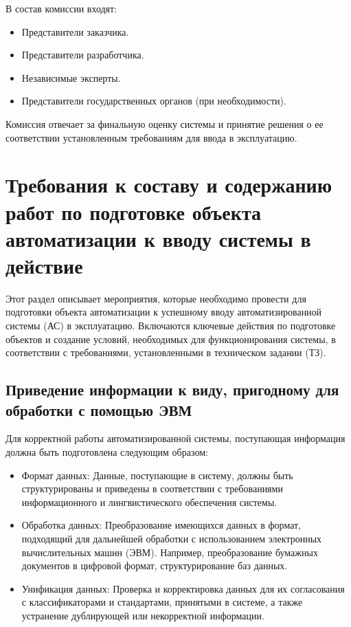 \noindent В состав комиссии входят:
\begin{itemize}
    \item Представители заказчика.
    \item Представители разработчика.
    \item Независимые эксперты.
    \item Представители государственных органов (при необходимости).
\end{itemize}

Комиссия отвечает за финальную оценку системы и принятие решения о ее соответствии установленным требованиям для ввода в эксплуатацию.

\section{Требования к составу и содержанию работ по подготовке объекта
автоматизации к вводу системы в действие}

Этот раздел описывает мероприятия, которые необходимо провести для подготовки объекта автоматизации к успешному вводу автоматизированной системы (АС) в эксплуатацию. Включаются ключевые действия по подготовке объектов и создание условий, необходимых для функционирования системы, в соответствии с требованиями, установленными в техническом задании (ТЗ).

\subsection{Приведение информации к виду, пригодному для обработки с помощью ЭВМ}
Для корректной работы автоматизированной системы, поступающая информация должна быть подготовлена следующим образом:
\begin{itemize}
    \item Формат данных: Данные, поступающие в систему, должны быть структурированы и приведены в соответствии с требованиями информационного и лингвистического обеспечения системы.
    \item Обработка данных: Преобразование имеющихся данных в формат, подходящий для дальнейшей обработки с использованием электронных вычислительных машин (ЭВМ). Например, преобразование бумажных документов в цифровой формат, структурирование баз данных.
    \item Унификация данных: Проверка и корректировка данных для их согласования с классификаторами и стандартами, принятыми в системе, а также устранение дублирующей или некорректной информации.
\end{itemize}


